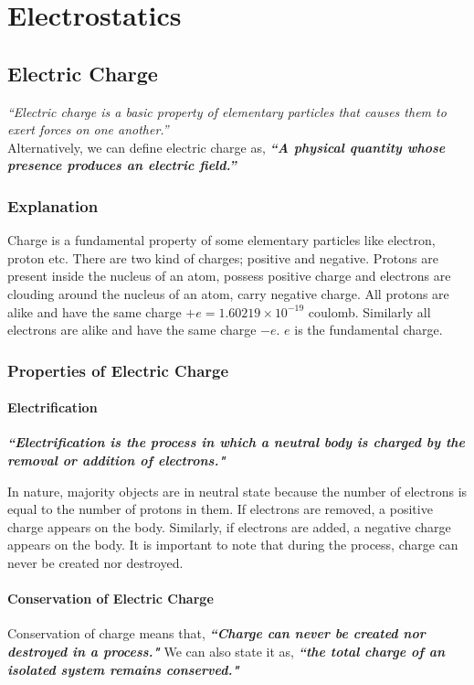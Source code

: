 \chapter{Electrostatics}
\label{11}
\section{Electric Charge}
\textit{``Electric charge is a basic property of elementary particles that causes them to exert forces on one another.”}\\
\indent Alternatively, we can define electric charge as,
\textit{\textbf{“A physical quantity whose presence produces an electric field.”}}
\subsection*{Explanation}
Charge is a fundamental property of some elementary particles like 
electron, proton etc. There are two kind of charges; positive and 
negative. Protons are present inside the nucleus of an atom, possess 
positive charge and electrons are clouding around the nucleus of an 
atom, carry negative charge. All protons are alike and have the same 
charge $+e = 1.60219\times 10^{-19}$ coulomb. Similarly all electrons are alike 
and have the same charge $-e$. $e$ is the fundamental charge.
\subsection{Properties of Electric Charge}
\subsubsection{Electrification}
\textit{\textbf{
  ``Electrification is the process in which a neutral body is 
charged by the removal or addition of electrons."
}}

In nature, majority objects are in neutral state because the number of electrons 
is equal to the number of protons in them. If electrons are removed, a positive charge appears on the body. Similarly, if electrons are added, a negative charge 
appears on the body. It is important to note that during 
the process, charge can never be created nor destroyed.
\subsubsection{Conservation of Electric Charge}
Conservation of charge means that, \textit{\textbf{``Charge can never be created nor destroyed in a process."}}
We can also state it as,
\textit{
  \textbf{
    ``the total charge of an isolated system remains conserved."
  }
}
